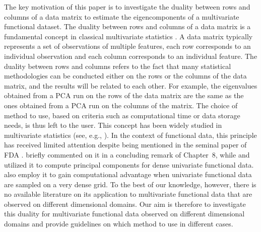 \documentclass[times,sort&compress,3p]{elsarticle}
\theoremstyle{plain}%
\theoremstyle{definition}
\begin{document}
The key motivation of this paper is to investigate the duality between rows and columns of a data matrix to estimate the eigencomponents of a multivariate functional dataset. The duality between rows and columns of a data matrix is a fundamental concept in classical multivariate statistics \cite{escofierTraitementSimultaneVariables1979,saportaSimultaneousAnalysisQualitative1990}. A data matrix typically represents a set of observations of multiple features, each row corresponds to an individual observation and each column corresponds to an individual feature. The duality between rows and columns refers to the fact that many statistical methodologies can be conducted either on the rows or the columns of the data matrix, and the results will be related to each other. For example, the eigenvalues obtained from a PCA run on the rows of the data matrix are the same as the ones obtained from a PCA run on the columns of the matrix. The choice of method to use, based on criteria such as computational time or data storage needs, is thus left to the user. This concept has been widely studied in multivariate statistics (see, e.g., \cite{pagesMultipleFactorAnalysis2014,hardleAppliedMultivariateStatistical2019}). In the context of functional data, this principle has received limited attention despite being mentioned in the seminal paper of FDA \cite{ramsayWhenDataAre1982a}. \citet{ramsayFunctionalDataAnalysis2005} briefly commented on it in a concluding remark of Chapter~8, while \citet{kneipInferenceDensityFamilies2001} and \citet{benkoCommonFunctionalPrincipal2009} utilized it to compute principal components for dense univariate functional data. \citet{chenQuantifyingInfiniteDimensionalData2017} also employ it to gain computational advantage when univariate functional data are sampled on a very dense grid. To the best of our knowledge, however, there is no available literature on its application to multivariate functional data that are observed on different dimensional domains. Our aim is therefore to investigate this duality for multivariate functional data observed on different dimensional domains and provide guidelines on which method to use in different cases.
\end{document}
